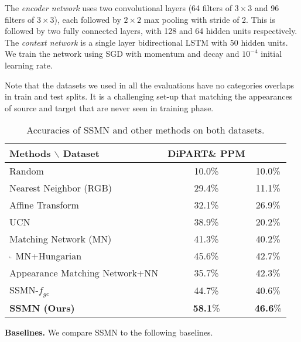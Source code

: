 \documentclass[10pt,twocolumn,letterpaper]{article}
\newcommand{\dataset}{\mbox{DiPART}}
\begin{document}
The \emph{encoder network} uses two convolutional layers (64 filters of $3 \times 3$ and 96 filters of $3 \times 3$), each followed by $2 \times 2$ max pooling with stride of 2. This is followed by two fully connected layers, with 128 and 64 hidden units respectively. The \emph{context network} is a single layer bidirectional LSTM with 50 hidden units. We train the network using SGD with momentum and decay and $10^{-4}$ initial learning rate.

Note that the datasets we used in all the evaluations have no categories overlaps in train and test splits. It is a challenging set-up that matching the appearances of source and target that are never seen in training phase.

\begin{table}[t]
    \centering
    \begin{tabular}{lcc} 
        \toprule
        Methods $\backslash$ Dataset & \dataset\& PPM \\
        \hline
        Random                      & 10.0\% & 10.0\%\\
        Nearest Neighbor (RGB)      & 29.4\% & 11.1\%\\
        Affine Transform            & 32.1\% & 26.9\%\\
        UCN~\cite{Choy2016UniversalCN}         
                                    & 38.9\% & 20.2\%\\
        Matching Network (MN)~\cite{vinyalsBLKW16}    
                                    & 41.3\% & 40.2\%\\
        $^\llcorner$ MN+Hungarian        
                                    & 45.6\% & 42.7\%\\ %
        \hline
        Appearance Matching Network+NN   
                                    & 35.7\% & 42.3\%\\ %
        SSMN-$f_{gc}$
                                    & 44.7\% & 40.6\%\\
        \textbf{SSMN (Ours)}
                                    & \textbf{58.1}\% & \textbf{46.6}\%\\
        \bottomrule
    \end{tabular}
    \caption{Accuracies of SSMN and other methods on both datasets.}
    \vspace{-1em}
    \label{tab:results_10part}
\end{table}\vspace{.5em}\noindent\textbf{Baselines.}
We compare SSMN to the following baselines.
\end{document}
